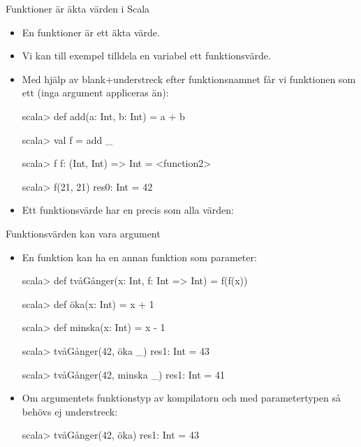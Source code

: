 \begin{Slide}{Funktioner är äkta värden i Scala}\SlideFontSmall
\begin{itemize}
\item En funktioner är ett äkta värde.
\item Vi kan till exempel tilldela en variabel ett funktionsvärde.
\item Med hjälp av blank+understreck efter funktionsnamnet får vi funktionen som ett  (inga argument appliceras än):
\begin{REPLnonum}
scala> def add(a: Int, b: Int) = a + b

scala> val f = add _

scala> f
f: (Int, Int) => Int = <function2>

scala> f(21, 21)
res0: Int = 42
\end{REPLnonum}

\item Ett funktionsvärde har en  precis som alla värden: \\
\end{itemize}
\end{Slide}

\begin{Slide}{Funktionsvärden kan vara argument}
\begin{itemize}
\item En funktion kan ha en annan funktion som parameter:
\begin{REPL}
scala> def tvåGånger(x: Int, f: Int => Int) = f(f(x))

scala> def öka(x: Int) = x + 1

scala> def minska(x: Int) = x - 1

scala> tvåGånger(42, öka _)
res1: Int = 43

scala> tvåGånger(42, minska _)
res1: Int = 41
\end{REPL}

\item Om argumentets funktionstyp  av kompilatorn och  med parametertypen så behövs ej understreck: \\
\begin{REPL}
scala> tvåGånger(42, öka)
res1: Int = 43
\end{REPL}\end{itemize}
\end{Slide}



